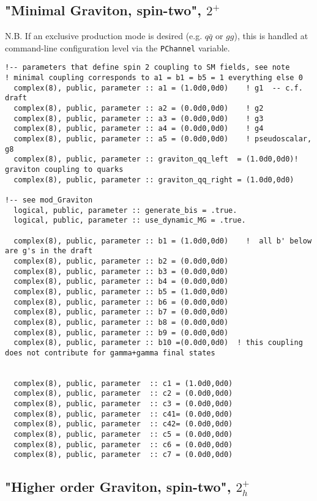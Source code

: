 \documentclass[aps,superscriptaddress,nofootinbib]{revtex4}
\begin{document}
\subsection{"Minimal Graviton, spin-two", $2^+$}

N.B. If an exclusive production mode is desired (e.g. $q\bar{q}$ or $gg$), this is handled at command-line configuration level via the \verb|PChannel| variable.

\footnotesize
\begin{verbatim}
!-- parameters that define spin 2 coupling to SM fields, see note
! minimal coupling corresponds to a1 = b1 = b5 = 1 everything else 0
  complex(8), public, parameter :: a1 = (1.0d0,0d0)    ! g1  -- c.f. draft
  complex(8), public, parameter :: a2 = (0.0d0,0d0)    ! g2
  complex(8), public, parameter :: a3 = (0.0d0,0d0)    ! g3
  complex(8), public, parameter :: a4 = (0.0d0,0d0)    ! g4
  complex(8), public, parameter :: a5 = (0.0d0,0d0)    ! pseudoscalar, g8
  complex(8), public, parameter :: graviton_qq_left  = (1.0d0,0d0)! graviton coupling to quarks
  complex(8), public, parameter :: graviton_qq_right = (1.0d0,0d0)

!-- see mod_Graviton
  logical, public, parameter :: generate_bis = .true.
  logical, public, parameter :: use_dynamic_MG = .true.

  complex(8), public, parameter :: b1 = (1.0d0,0d0)    !  all b' below are g's in the draft
  complex(8), public, parameter :: b2 = (0.0d0,0d0)
  complex(8), public, parameter :: b3 = (0.0d0,0d0)
  complex(8), public, parameter :: b4 = (0.0d0,0d0)
  complex(8), public, parameter :: b5 = (1.0d0,0d0)
  complex(8), public, parameter :: b6 = (0.0d0,0d0)
  complex(8), public, parameter :: b7 = (0.0d0,0d0)
  complex(8), public, parameter :: b8 = (0.0d0,0d0)
  complex(8), public, parameter :: b9 = (0.0d0,0d0)
  complex(8), public, parameter :: b10 =(0.0d0,0d0)  ! this coupling does not contribute for gamma+gamma final states


  complex(8), public, parameter  :: c1 = (1.0d0,0d0)
  complex(8), public, parameter  :: c2 = (0.0d0,0d0)
  complex(8), public, parameter  :: c3 = (0.0d0,0d0)
  complex(8), public, parameter  :: c41= (0.0d0,0d0)
  complex(8), public, parameter  :: c42= (0.0d0,0d0)
  complex(8), public, parameter  :: c5 = (0.0d0,0d0)
  complex(8), public, parameter  :: c6 = (0.0d0,0d0)
  complex(8), public, parameter  :: c7 = (0.0d0,0d0)
\end{verbatim}
\normalsize

\subsection{"Higher order Graviton, spin-two", $2^+_h$}
\end{document}
